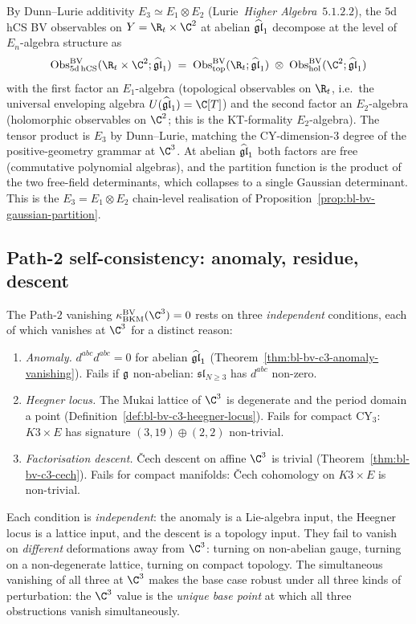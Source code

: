 \begin{remark}
\label{rem:bl-bv-c3-dunn-lurie}
By Dunn--Lurie additivity $E_3 \simeq E_1\otimes E_2$
(Lurie~\textit{Higher Algebra}~$5.1.2.2$), the $5$d hCS BV
observables on $Y = \R_t\times\C^2$ at abelian $\widehat{\mathfrak{gl}}_1$ decompose
at the level of $E_n$-algebra structure as
\[
  \Obs^\BV_{5\mathrm{d\,hCS}}(\R_t\times\C^2;\ghat)
  \;=\;
  \Obs^\BV_{\mathrm{top}}(\R_t;\ghat)
  \;\otimes\;
  \Obs^\BV_{\mathrm{hol}}(\C^2;\ghat)
\]
with the first factor an $E_1$-algebra (topological observables on
$\R_t$, i.e.\ the universal enveloping algebra
$U(\ghat) = \C[T]$) and the second factor an $E_2$-algebra
(holomorphic observables on $\C^2$; this is the KT-formality
$E_2$-algebra). The tensor product is $E_3$ by Dunn--Lurie, matching
the CY-dimension-$3$ degree of the positive-geometry grammar at
$\C^3$. At abelian $\widehat{\mathfrak{gl}}_1$ both factors are free (commutative
polynomial algebras), and the partition function is the product of
the two free-field determinants, which collapses to a single
Gaussian determinant. This is the $E_3 = E_1\otimes E_2$ chain-level
realisation of Proposition~\ref{prop:bl-bv-gaussian-partition}.
\end{remark}

\subsection*{Path-2 self-consistency: anomaly, residue, descent}

\begin{remark}
\label{rem:bl-bv-c3-three-conditions}
The Path-$2$ vanishing $\kBKM^{\mathrm{BV}}(\C^3) = 0$ rests on
three \emph{independent} conditions, each of which vanishes at
$\C^3$ for a distinct reason:
\begin{enumerate}[label=(\roman*)]
\item \emph{Anomaly.} $d^{abc}d^{abc} = 0$ for abelian $\widehat{\mathfrak{gl}}_1$
(Theorem~\ref{thm:bl-bv-c3-anomaly-vanishing}). Fails if $\mathfrak{g}$
non-abelian: $\mathfrak{sl}_{N\geq 3}$ has $d^{abc}$ non-zero.
\item \emph{Heegner locus.} The Mukai lattice of $\C^3$ is
degenerate and the period domain a point
(Definition~\ref{def:bl-bv-c3-heegner-locus}). Fails for compact
CY$_3$: $K3\times E$ has signature $(3, 19)\oplus(2, 2)$ non-trivial.
\item \emph{Factorisation descent.} \v{C}ech descent on affine $\C^3$
is trivial (Theorem~\ref{thm:bl-bv-c3-cech}). Fails for compact
manifolds: \v{C}ech cohomology on $K3\times E$ is non-trivial.
\end{enumerate}
Each condition is \emph{independent}: the anomaly is a Lie-algebra
input, the Heegner locus is a lattice input, and the descent is a
topology input. They fail to vanish on \emph{different} deformations
away from $\C^3$: turning on non-abelian gauge, turning on a
non-degenerate lattice, turning on compact topology. The
simultaneous vanishing of all three at $\C^3$ makes the base case
robust under all three kinds of perturbation: the $\C^3$ value is
the \emph{unique base point} at which all three obstructions vanish
simultaneously.
\end{remark}

